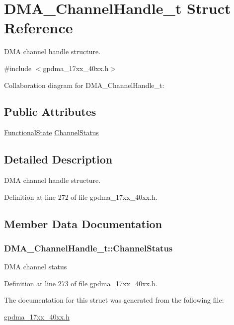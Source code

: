\hypertarget{structDMA__ChannelHandle__t}{}\section{D\+M\+A\+\_\+\+Channel\+Handle\+\_\+t Struct Reference}
\label{structDMA__ChannelHandle__t}


D\+MA channel handle structure.  




{\ttfamily \#include $<$gpdma\+\_\+17xx\+\_\+40xx.\+h$>$}



Collaboration diagram for D\+M\+A\+\_\+\+Channel\+Handle\+\_\+t\+:
\subsection*{Public Attributes}
\begin{DoxyCompactItemize}
\item 
\hyperlink{group__LPC__Types__Public__Types_gac9a7e9a35d2513ec15c3b537aaa4fba1}{Functional\+State} \hyperlink{structDMA__ChannelHandle__t_ae776f1fa849f377ff64ffe9b8522105f}{Channel\+Status}
\end{DoxyCompactItemize}


\subsection{Detailed Description}
D\+MA channel handle structure. 

Definition at line 272 of file gpdma\+\_\+17xx\+\_\+40xx.\+h.



\subsection{Member Data Documentation}
\subsubsection[{\texorpdfstring{Channel\+Status}{ChannelStatus}}]{ D\+M\+A\+\_\+\+Channel\+Handle\+\_\+t\+::\+Channel\+Status}\hypertarget{structDMA__ChannelHandle__t_ae776f1fa849f377ff64ffe9b8522105f}{}\label{structDMA__ChannelHandle__t_ae776f1fa849f377ff64ffe9b8522105f}
D\+MA channel status 

Definition at line 273 of file gpdma\+\_\+17xx\+\_\+40xx.\+h.



The documentation for this struct was generated from the following file\+:\begin{DoxyCompactItemize}
\item 
\hyperlink{gpdma__17xx__40xx_8h}{gpdma\+\_\+17xx\+\_\+40xx.\+h}\end{DoxyCompactItemize}
